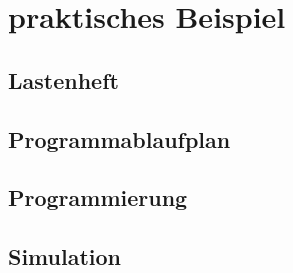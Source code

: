 \section{praktisches Beispiel}
\subsection{Lastenheft}

\subsection{Programmablaufplan}

\subsection{Programmierung}

\subsection{Simulation}